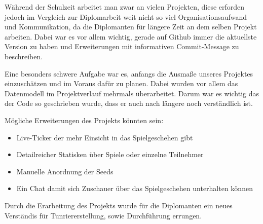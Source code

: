 Während der Schulzeit arbeitet man zwar an vielen Projekten,
diese erforden jedoch im Vergleich zur Diplomarbeit weit nicht so viel Organisationsaufwand und Kommunikation, da die Diplomanten
für längere Zeit an dem selben Projekt arbeiten. Dabei war es vor allem wichtig, gerade auf Github immer die aktuellste Version zu haben und Erweiterungen mit
informativen Commit-Message zu beschreiben. 

Eine besonders schwere Aufgabe war es, anfangs die Ausmaße unseres Projektes einzuschätzen und im Voraus dafür zu planen. Dabei wurden vor allem das Datenmodell im Projektverlauf mehrmals überarbeitet.
Darum war es wichtig das der Code so geschrieben wurde, dass er auch nach längere noch verständlich ist.

Mögliche Erweiterungen des Projekts könnten sein:

\begin{itemize}
    \item Live-Ticker der mehr Einsicht in das Spielgeschehen gibt
    \item Detailreicher Statisken über Spiele oder einzelne Teilnehmer
    \item Manuelle Anordnung der Seeds
    \item Ein Chat damit sich Zuschauer über das Spielgeschehen unterhalten können
\end{itemize}

Durch die Erarbeitung des Projekts wurde für die Diplomanten ein neues Verständis für Tunriererstellung, sowie Durchführung errungen.